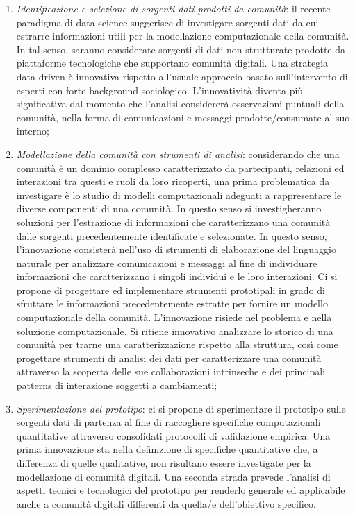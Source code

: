 \begin{enumerate}[label=\theenumi.]

\item \textit{Identificazione e selezione di sorgenti dati prodotti da comunit{\`a}}: il recente paradigma di data science suggerisce di investigare sorgenti dati da cui estrarre informazioni utili per la modellazione computazionale della comunit{\`a}. In tal senso, saranno considerate sorgenti di dati non strutturate prodotte da piattaforme tecnologiche che supportano comunit{\`a} digitali. Una strategia data-driven {\`e} innovativa rispetto all'usuale approccio basato sull'intervento di esperti con forte background sociologico. L'innovativit{\`a} diventa pi{\`u} significativa dal momento che l'analisi considerer{\`a} osservazioni puntuali della comunit{\`a}, nella forma di comunicazioni e messaggi prodotte/consumate al suo interno;

\item \textit{Modellazione della comunit{\`a} con strumenti di analisi}: considerando che una comunit{\`a} {\`e} un dominio complesso caratterizzato da partecipanti, relazioni ed interazioni tra questi e ruoli da loro ricoperti, una prima problematica da investigare {\`e} lo studio di modelli computazionali adeguati a rappresentare le diverse componenti di una comunit{\`a}. In questo senso si investigheranno soluzioni per l'estrazione di informazioni che caratterizzano una comunit{\`a} dalle sorgenti precedentemente identificate e selezionate. In questo senso, l'innovazione consister{\`a} nell'uso di strumenti di elaborazione del linguaggio naturale per analizzare comunicazioni e messaggi al fine di individuare informazioni che caratterizzano i singoli individui e le loro interazioni. Ci si propone di progettare ed implementare strumenti prototipali in grado di sfruttare le informazioni precedentemente estratte per fornire un modello computazionale della comunit{\`a}. L'innovazione risiede nel problema e nella soluzione computazionale. Si ritiene innovativo analizzare lo storico di una comunit{\`a} per trarne una caratterizzazione rispetto alla struttura, cos{\`i} come progettare strumenti di analisi dei dati per caratterizzare una comunit{\`a} attraverso la scoperta delle sue collaborazioni intrinseche e dei principali patterns di interazione soggetti a cambiamenti;

\item \textit{Sperimentazione del prototipo}: ci si propone di sperimentare il prototipo sulle sorgenti dati di partenza al fine di raccogliere specifiche computazionali quantitative attraverso consolidati protocolli di validazione empirica. Una prima innovazione sta nella definizione di specifiche quantitative che, a differenza di quelle qualitative, non risultano essere investigate per la modellazione di comunit{\`a} digitali. Una seconda strada prevede l'analisi di aspetti tecnici e tecnologici del prototipo per renderlo generale ed applicabile anche a comunit{\`a} digitali differenti da quella/e dell'obiettivo specifico. 

\end{enumerate}

